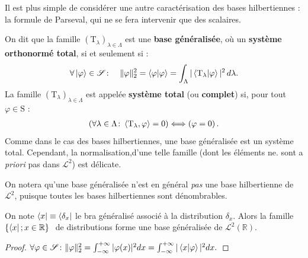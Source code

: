 \smallskip

Il est plus simple de considérer une autre caractérisation des bases hilbertiennes : la formule de Parseval, qui ne se fera intervenir que des scalaires.

\begin{Defi} On dit que la famille $(\mathrm T_\lambda)_{\lambda \in \Lambda}$ est une {\bf base généralisée}, où un {\bf système orthonormé total}, si et seulement si :
    \begin{eqnarray}
        \forall \ket{\varphi} \in \mathscr S \colon \quad \Vert \varphi \Vert_2^2 = \braket{\varphi \vert \varphi } = \int_\Lambda \vert \braket{\mathrm T_\lambda \vert \varphi }\vert^2 \, d \lambda.
    \end{eqnarray}
    La famille $(\mathrm T_\lambda)_{\lambda \in \Lambda}$ est appelée {\bf système total} (ou {\bf complet}) si, pour tout $\varphi \in \mathrm S$ :
    \begin{eqnarray}
        \left (  \forall \lambda \in \Lambda \colon \braket{ \mathrm T_\lambda , \varphi }   = 0  \right ) \Longleftrightarrow \left ( \varphi = 0 \right ).
    \end{eqnarray}
    Comme dans le cas des bases hilbertiennes, une base généralisée est un système total. Cependant, la normalisation,d'une telle famille (dont les éléments ne. sont a {\em priori} pas dans $\mathcal L^2$) est délicate.

    \smallskip

    On notera qu'une base généralisée n'est en général {\em pas} une base hilbertienne de $\mathcal L^2$, puisque toutes les bases hilbertiennes sont dénombrables.

\end{Defi}

\begin{Theo} On note $\bra{x} \equiv \bra{ \delta_x}$ le bra généralisé associé à la distribution $\delta_x$. Alors la famille $\{ \bra{x} ; x \in \mathbb R \} $ de distributions forme une base généralisée de $\mathcal L^2 (\mathbb R )$.
\end{Theo}
\begin{proof}
    $ \forall \varphi \in \mathscr S \colon \Vert \varphi \Vert_2^2 = \int_{-\infty}^{+\infty} \vert \varphi(x) \vert^2 dx = \int_{-\infty}^{+\infty} \vert \braket{x \vert \varphi }\vert^2 dx.$
\end{proof}

